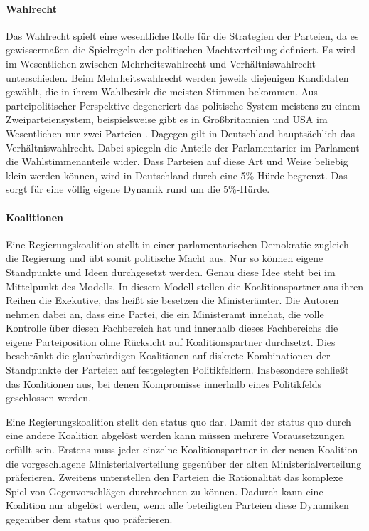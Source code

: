 \paragraph{Wahlrecht}
Das Wahlrecht spielt eine wesentliche Rolle für die Strategien der Parteien, da es gewissermaßen die Spielregeln der politischen Machtverteilung definiert.
Es wird im Wesentlichen zwischen Mehrheitswahlrecht und Verhältniswahlrecht unterschieden.
Beim Mehrheitswahlrecht werden jeweils diejenigen Kandidaten gewählt, die in ihrem Wahlbezirk die meisten Stimmen bekommen.
Aus parteipolitischer Perspektive degeneriert das politische System meistens zu einem Zweiparteiensystem, beispielsweise gibt es in Großbritannien und USA im Wesentlichen nur zwei Parteien \citep[S.\,257-258]{schofield1998germany}.
Dagegen gilt in Deutschland hauptsächlich das Verhältniswahlrecht.
Dabei spiegeln die Anteile der Parlamentarier im Parlament die Wahlstimmenanteile wider.
Dass Parteien auf diese Art und Weise beliebig klein werden können, wird in Deutschland durch eine 5\%-Hürde begrenzt.
Das sorgt für eine völlig eigene Dynamik rund um die 5\%-Hürde.

\paragraph{Koalitionen}
Eine Regierungskoalition stellt in einer parlamentarischen Demokratie zugleich die Regierung und übt somit politische Macht aus.
Nur so können eigene Standpunkte und Ideen durchgesetzt werden. 
Genau diese Idee steht bei \citet{laver1990coalitions} im Mittelpunkt des Modells.
In diesem Modell stellen die Koalitionspartner aus ihren Reihen die Exekutive, das heißt sie besetzen die Ministerämter. Die Autoren nehmen dabei an, dass eine Partei, die ein Ministeramt innehat, die volle Kontrolle über diesen Fachbereich hat und innerhalb dieses Fachbereichs die eigene Parteiposition ohne Rücksicht auf Koalitionspartner durchsetzt. Dies beschränkt die glaubwürdigen Koalitionen auf diskrete Kombinationen der Standpunkte der Parteien auf festgelegten Politikfeldern. Insbesondere schließt das Koalitionen aus, bei denen Kompromisse innerhalb eines Politikfelds geschlossen werden. \citep[S.\,873-875]{laver1990coalitions}

Eine Regierungskoalition stellt den status quo dar. Damit der status quo durch eine andere Koalition abgelöst werden kann müssen mehrere Voraussetzungen erfüllt sein. Erstens muss jeder einzelne Koalitionspartner in der neuen Koalition die vorgeschlagene Ministerialverteilung gegenüber der alten Ministerialverteilung präferieren. Zweitens unterstellen \citet{laver1990coalitions} den Parteien die Rationalität das komplexe Spiel von Gegenvorschlägen durchrechnen zu können. Dadurch kann eine Koalition nur abgelöst werden, wenn alle beteiligten Parteien diese Dynamiken gegenüber dem status quo präferieren. \citep[S.\,877-878]{laver1990coalitions}

